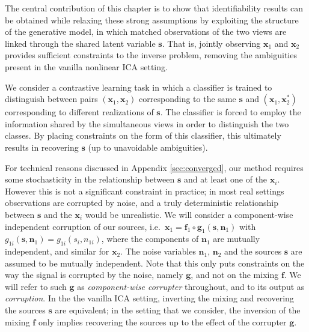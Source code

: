 The central contribution of this chapter is to show that identifiability results can be obtained while relaxing these strong assumptions by exploiting the structure of the generative model, in which matched observations of the two views are linked through the shared latent variable $\bm{s}$. 
That is, jointly observing $\bm{x}_1$ and $\bm{x}_2$ provides sufficient constraints to the inverse problem, removing the ambiguities present in the vanilla nonlinear ICA setting.

We consider a contrastive learning task in which a classifier is trained to distinguish between pairs $(\bm{x}_1, \bm{x}_2)$ corresponding to the same $\bm{s}$ and $(\bm{x}_1, \bm{x}^*_2)$ corresponding to different realizations of $\bm{s}$.
The classifier is forced to employ the information shared by the simultaneous views in order to distinguish the two classes.
By placing constraints on the form of this classifier, this ultimately results in recovering $\bm{s}$ (up to unavoidable ambiguities).

For technical reasons discussed in Appendix
\ref{sec:converged}, our method requires some stochasticity in the relationship between $\bm{s}$ and at least one of the $\bm{x}_i$.
However this is not a significant constraint in practice; in most real settings observations are corrupted by noise, and a truly deterministic relationship between $\bm{s}$ and the $\bm{x}_i$ would be unrealistic.
We will consider a component-wise independent corruption of our sources, i.e.~$\bm{x}_1 = \bm{f}_1 \circ \bm{g}_1(\bm{s}, \bm{n}_1)$ with $g_{1i}(\bm{s}, \bm{n}_1) = g_{1i}(s_i, n_{1i})$, where the components of $\bm{n}_{1}$ are mutually independent, and similar for $\bm{x}_2$. The noise variables $\bm{n}_1$, $\bm{n}_2$ and the sources $\bm{s}$ are assumed to be mutually independent.
Note that this only puts constraints on the way the signal is corrupted by the noise, namely $\bm{g}$, and not on the mixing $\bm{f}$.
We will refer to such $\bm{g}$ as \emph{component-wise corrupter} throughout, and to its output as \emph{corruption}.
In the the vanilla ICA setting, inverting the mixing and recovering the sources $\bm{s}$ are equivalent; in the setting that we consider, the inversion of the mixing $\bm{f}$ only implies recovering the sources up to the effect of the corrupter $\bm{g}$.

